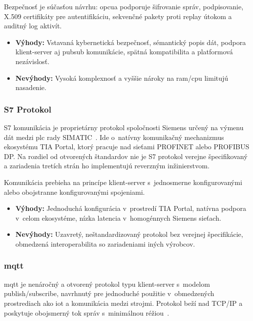 Bezpečnosť je súčasťou návrhu: \acrshort{opcua} podporuje šifrovanie správ,
podpisovanie, X.509 certifikáty pre autentifikáciu, sekvenčné pakety proti
replay útokom a auditný log aktivít.

\begin{itemize}
      \item \textbf{Výhody:} Vstavaná kybernetická bezpečnosť, sémantický
            popis dát, podpora klient-server aj \acrshort{pubsub} komunikácie,
            spätná kompatibilita a platformová nezávislosť.
      \item \textbf{Nevýhody:} Vysoká komplexnosť a vyššie nároky na
            \acrshort{ram}/\acrshort{cpu} limitujú nasadenie.
\end{itemize}

\subsubsection{S7 Protokol}

S7 komunikácia je proprietárny protokol spoločnosti Siemens určený na výmenu
dát medzi \acrshort{plc} rady SIMATIC~\cite{t15}. Ide o~natívny komunikačný
mechanizmus ekosystému TIA Portal, ktorý pracuje nad sieťami PROFINET alebo
PROFIBUS DP. Na rozdiel od otvorených štandardov nie je S7 protokol verejne
špecifikovaný a zariadenia tretích strán ho implementujú reverzným
inžinierstvom.

Komunikácia prebieha na princípe klient-server s~jednosmerne konfigurovanými
alebo obojstranne konfigurovanými spojeniami.

\begin{itemize}
      \item \textbf{Výhody:} Jednoduchá konfigurácia v~prostredí TIA Portal,
            natívna podpora v~celom ekosystéme, nízka latencia
            v~homogénnych Siemens sieťach.
      \item \textbf{Nevýhody:} Uzavretý, neštandardizovaný protokol bez
            verejnej špecifikácie, obmedzená interoperabilita so zariadeniami
            iných výrobcov.
\end{itemize}

\subsubsection{\acrshort{mqtt}}

\acrshort{mqtt} je nenáročný a otvorený
protokol typu klient-server s~modelom publish/subscribe, navrhnutý
pre jednoduché použitie v~obmedzených prostrediach ako \acrshort{iot}
a komunikácia medzi strojmi. Protokol beží nad TCP/IP
a poskytuje obojsmerný tok správ s~minimálnou réžiou~\cite{t13}.

